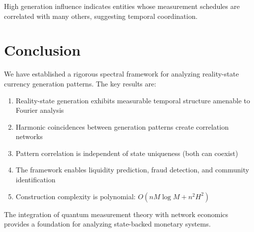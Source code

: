\documentclass[12pt]{article}
\begin{document}
High generation influence indicates entities whose measurement schedules are correlated with many others, suggesting temporal coordination.

\section{Conclusion}

We have established a rigorous spectral framework for analyzing reality-state currency generation patterns. The key results are:

\begin{enumerate}
    \item Reality-state generation exhibits measurable temporal structure amenable to Fourier analysis
    \item Harmonic coincidences between generation patterns create correlation networks
    \item Pattern correlation is independent of state uniqueness (both can coexist)
    \item The framework enables liquidity prediction, fraud detection, and community identification
    \item Construction complexity is polynomial: $O(nM\log M + n^2H^2)$
\end{enumerate}

The integration of quantum measurement theory with network economics provides a foundation for analyzing state-backed monetary systems.
\end{document}
